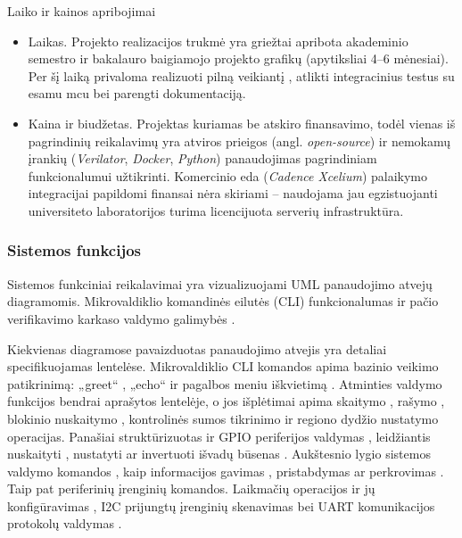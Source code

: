 Laiko ir kainos apribojimai \\
\begin{itemize}
	\item Laikas. Projekto realizacijos trukmė yra griežtai apribota akademinio semestro ir bakalauro baigiamojo projekto grafikų (apytiksliai 4--6 mėnesiai). Per šį laiką privaloma realizuoti pilną veikiantį , atlikti integracinius testus su esamu \gls{mcu} bei parengti dokumentaciją.
	\item Kaina ir biudžetas. Projektas kuriamas be atskiro finansavimo, todėl vienas iš pagrindinių reikalavimų yra atviros prieigos (angl. \textit{open-source}) ir nemokamų įrankių (\textit{Verilator}, \textit{Docker}, \textit{Python}) panaudojimas pagrindiniam funkcionalumui užtikrinti. Komercinio \gls{eda} (\textit{Cadence Xcelium}) palaikymo integracijai papildomi finansai nėra skiriami -- naudojama jau egzistuojanti universiteto laboratorijos turima licencijuota serverių infrastruktūra. 
\end{itemize}

\subsubsection{Sistemos funkcijos}\label{section:sistemos-funkcijos}

Sistemos funkciniai reikalavimai yra vizualizuojami UML panaudojimo atvejų diagramomis. Mikrovaldiklio komandinės eilutės (CLI) funkcionalumas \pav{\ref{fig:uml_use_case_cli}} ir pačio verifikavimo karkaso valdymo galimybės \pav{\ref{fig:uml_use_case_mlab_mcu_uvm}}.

Kiekvienas diagramose pavaizduotas panaudojimo atvejis yra detaliai specifikuojamas lentelėse. Mikrovaldiklio CLI komandos apima bazinio veikimo patikrinimą: „greet“ \lent{\ref{tab:usecase:cli:greet}}, „echo“ \lent{\ref{tab:usecase:cli:echo}} ir pagalbos meniu iškvietimą \lent{\ref{tab:usecase:cli:help}}. Atminties valdymo funkcijos bendrai aprašytos \lent{\ref{tab:usecase:cli:mem}} lentelėje, o jos išplėtimai apima skaitymo \lent{\ref{tab:usecase:cli:mem:read}}, rašymo \lent{\ref{tab:usecase:cli:mem:write}}, blokinio nuskaitymo \lent{\ref{tab:usecase:cli:mem:dump}}, kontrolinės sumos tikrinimo \lent{\ref{tab:usecase:cli:mem:cksum}} ir regiono dydžio nustatymo \lent{\ref{tab:usecase:cli:mem:size}} operacijas. Panašiai struktūrizuotas ir GPIO periferijos valdymas \lent{\ref{tab:usecase:cli:gpio}}, leidžiantis nuskaityti \lent{\ref{tab:usecase:cli:gpio:get}}, nustatyti \lent{\ref{tab:usecase:cli:gpio:set}} ar invertuoti išvadų būsenas \lent{\ref{tab:usecase:cli:gpio:toggle}}. Aukštesnio lygio sistemos valdymo komandos \lent{\ref{tab:usecase:cli:sys}}, kaip informacijos gavimas \lent{\ref{tab:usecase:cli:sys:info}}, pristabdymas \lent{\ref{tab:usecase:cli:sys:pause}} ar perkrovimas \lent{\ref{tab:usecase:cli:sys:reset}}. Taip pat periferinių įrenginių komandos. Laikmačių operacijos \lent{\ref{tab:usecase:cli:time}} ir jų konfigūravimas \lent{\ref{tab:usecase:cli:time:set}}, I2C \lent{\ref{tab:usecase:cli:i2c}} prijungtų įrenginių skenavimas \lent{\ref{tab:usecase:cli:i2c:scan}} bei UART \lent{\ref{tab:usecase:cli:uart}} komunikacijos protokolų valdymas \lent{\ref{tab:usecase:cli:uart:cfg}}.

